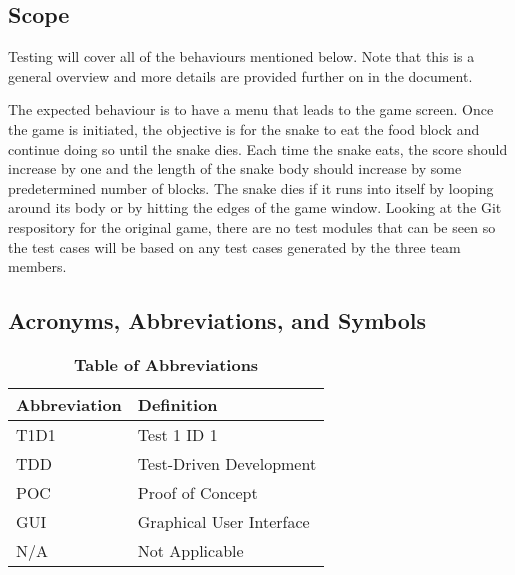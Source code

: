\documentclass[12pt, titlepage]{article}
\begin{document}
\subsection{Scope}
Testing will cover all of the behaviours mentioned below. Note that this is a general overview and more details are provided further on in the document.

The expected behaviour is to have a menu that leads to the game screen. Once the game is initiated, the objective is for the snake to eat the food block and continue doing so until the snake dies. Each time the snake eats, the score should increase by one and the length of the snake body should increase by some predetermined number of blocks. The snake dies if it runs into itself by looping around its body or by hitting the edges of the game window. 
Looking at the Git respository for the original game, there are no test modules that can be seen so the test cases will be based on any test cases generated by the three team members.

\subsection{Acronyms, Abbreviations, and Symbols}
	
\begin{table}[hbp]
\caption{\textbf{Table of Abbreviations}} \label{Table}

\begin{tabularx}{\textwidth}{p{3cm}X}
\toprule
\textbf{Abbreviation} & \textbf{Definition} \\
\midrule
T1D1 & Test 1 ID 1\\
TDD & Test-Driven Development\\
POC & Proof of Concept\\
GUI & Graphical User Interface\\
N/A & Not Applicable\\
\bottomrule
\end{tabularx}

\end{table}
\end{document}
